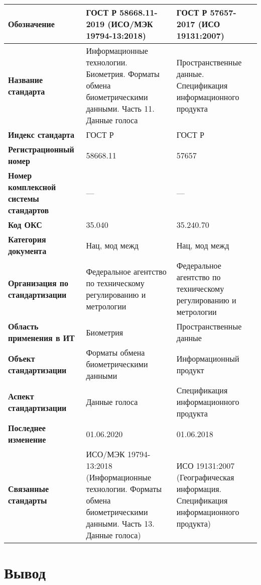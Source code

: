 \begin{table}[h!tp]
	\centering
	\caption{}
	\label{table:national:international:mod}
	\begin{tabular}{|p{10em}|p{11em}|p{11em}|}
		\hline
		\textbf{Обозначение}
			& \textbf{ГОСТ Р 58668.11-2019 (ИСО/МЭК 19794-13:2018)}
			& \textbf{ГОСТ Р 57657-2017 (ИСО 19131:2007)} \\ \hline
		\textbf{Название стандарта}
			& Информационные технологии. Биометрия.
			Форматы обмена биометрическими данными. Часть 11. Данные голоса
			& Пространственные данные.
			Спецификация информационного продукта \\ \hline
		\textbf{Индекс стандарта}
			& ГОСТ Р & ГОСТ Р \\ \hline
		\textbf{Регистрационный номер}
			& 58668.11 & 57657 \\ \hline
		\textbf{Номер комплексной системы стандартов}
			& --- & --- \\ \hline
		\textbf{Код ОКС}
			& 35.040 & 35.240.70 \\ \hline
		\textbf{Категория документа}
			& Нац, мод межд & Нац, мод межд \\ \hline
		\textbf{Организация по стандартизации}
			& Федеральное агентство по техническому регулированию и метрологии
			& Федеральное агентство по техническому регулированию и метрологии \\ \hline
		\textbf{Область применения в ИТ}
			& Биометрия & Пространственные данные \\ \hline
		\textbf{Объект стандартизации}
			& Форматы обмена биометрическими данными
			& Информационный продукт \\ \hline
		\textbf{Аспект стандартизации}
			& Данные голоса & Спецификация информационного продукта \\ \hline
		\textbf{Последнее изменение}
			& 01.06.2020 & 01.06.2018 \\ \hline
		\textbf{Связанные стандарты}
			& ИСО/МЭК 19794-13:2018 (Информационные технологии.
			Форматы обмена биометрическими данными. Часть 13. Данные голоса)
			& ИСО 19131:2007 (Географическая информация.
			Спецификация информационного продукта) \\ \hline
	\end{tabular}
\end{table}

\clearpage

\section*{\LARGE Вывод}

